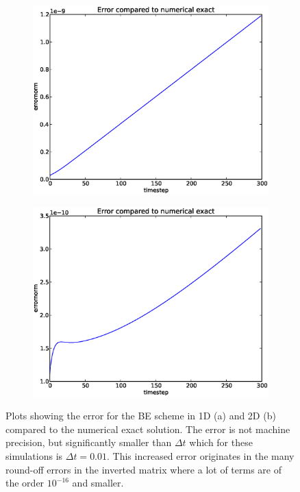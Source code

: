 \begin{figure}[H]
 \centering
 \begin{subfigure}{0.49\textwidth}
 \includegraphics[width=\textwidth]{../results/experiment_14042014_0759_BE1D_numerical_exact/results/numerical_exact.eps}
 \caption{}
\end{subfigure}
\begin{subfigure}{0.49\textwidth}
 \includegraphics[width=\textwidth]{../results/experiment_30042014_0914_BE2D_numex/results/numerical_exact.eps}
 \caption{}
\end{subfigure}
 \caption[Numerical exact error plots for BE scheme]{Plots showing the error for the BE scheme in 1D (a) and 2D (b) compared to the numerical exact solution. 
 The error is not machine precision, but significantly smaller than $\Delta t$ which for these simulations is $\Delta t=0.01$. 
 This increased error originates in the many round-off errors in the inverted matrix where a lot of terms are of the order $10^{-16}$ and smaller.}
 \label{numex:BE_errorplot}
\end{figure}

